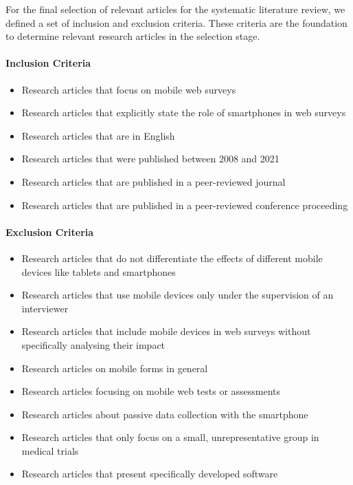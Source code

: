 For the final selection of relevant articles for the systematic literature review, we defined a set of inclusion and exclusion criteria. These criteria are the foundation to determine relevant research articles in the selection stage.

\paragraph{Inclusion Criteria}
\begin{itemize}
    \item Research articles that focus on mobile web surveys
    \item Research articles that explicitly state the role of smartphones in web surveys
    \item Research articles that are in English
    \item Research articles that were published between 2008 and 2021
    \item Research articles that are published in a peer-reviewed journal
    \item Research articles that are published in a peer-reviewed conference proceeding
\end{itemize}

\paragraph{Exclusion Criteria}
\begin{itemize}
    \item Research articles that do not differentiate the effects of different mobile devices like tablets and smartphones
    \item Research articles that use mobile devices only under the supervision of an interviewer
    \item Research articles that include mobile devices in web surveys without specifically analysing their impact
    \item Research articles on mobile forms in general
    \item Research articles focusing on mobile web tests or assessments
    \item Research articles about passive data collection with the smartphone
    \item Research articles that only focus on a small, unrepresentative group in medical trials
    \item Research articles that present specifically developed software
\end{itemize}

